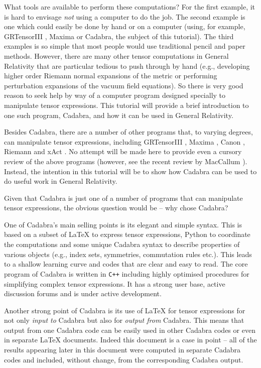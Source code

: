\documentclass[a4paper,12pt]{article}
\numberwithin{equation}{section}%
\begin{document}
What tools are available to perform these computations? For the first example, it is hard to
envisage \emph{not} using a computer to do the job. The second example is one which could
easily be done by hand or on a computer (using, for example, GRTensorIII
\cite{grtensorIII:2017-01}, Maxima \cite{maxima:2014-01} or Cadabra, the subject of this
tutorial). The third examples is so simple that most people would use traditional pencil and
paper methods. However, there are many other tensor computations in General Relativity that
are particular tedious to push through by hand (e.g., developing higher order Riemann normal
expansions of the metric or performing perturbation expansions of the vacuum field
equations). So there is very good reason to seek help by way of a computer program designed
specially to manipulate tensor expressions. This tutorial will provide a brief introduction
to one such program, Cadabra, and how it can be used in General Relativity.

Besides Cadabra, there are a number of other programs that, to varying degrees,
can manipulate tensor expressions, including
GRTensorIII \cite{grtensorIII:2017-01},
Maxima \cite{maxima:2014-01},
Canon \cite{manssur:2004-01},
Riemann \cite{portugal:1997-01} and
xAct \cite{xact:2008-01}.
No attempt will be made here to provide even a cursory review of the above programs
(however, see the recent review by MacCallum \cite{maccallum:2018-01}). Instead, the
intention in this tutorial will be to show how Cadabra can be used to do useful work in
General Relativity.

Given that Cadabra is just one of a number of programs that can manipulate tensor
expressions, the obvious question would be -- why chose Cadabra?

One of Cadabra's main selling points is its elegant and simple syntax. This is based on a
subset of LaTeX to express tensor expressions, Python to coordinate the computations and some
unique Cadabra syntax to describe properties of various objects (e.g., index sets,
symmetries, commutation rules etc.). This leads to a shallow learning curve and codes that
are clear and easy to read. The core program of Cadabra is written in {\tt C++} including
highly optimised procedures for simplifying complex tensor expressions. It has a strong user
base, active discussion forums and is under active development.

Another strong point of Cadabra is its use of LaTeX for tensor expressions for not only
\emph{input to} Cadabra but also for \emph{output from} Cadabra. This means that output from
one Cadabra code can be easily used in other Cadabra codes or even in separate LaTeX
documents. Indeed this document is a case in point -- all of the results appearing later in
this document were computed in separate Cadabra codes and included, without change, from the
corresponding Cadabra output.
\end{document}
